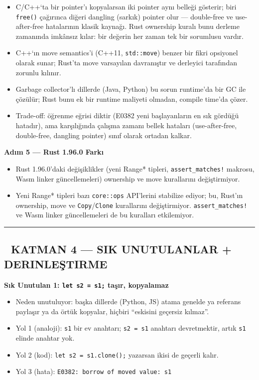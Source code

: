 \documentclass[12pt,a4paper]{article}
\begin{document}
\begin{itemize}
\tightlist
\item
  C/C++`ta bir pointer'ı kopyalarsan iki pointer aynı belleği gösterir; biri \texttt{free()} çağırınca diğeri dangling (sarkık) pointer olur --- double-free ve use-after-free hatalarının klasik kaynağı. Rust ownership kuralı bunu derleme zamanında imkânsız kılar: bir değerin her zaman tek bir sorumlusu vardır.
\item
  C++`ın move semantics'i (C++11, \texttt{std::move}) benzer bir fikri opsiyonel olarak sunar; Rust'ta move varsayılan davranıştır ve derleyici tarafından zorunlu kılınır.
\item
  Garbage collector'lı dillerde (Java, Python) bu sorun runtime'da bir GC ile çözülür; Rust bunu ek bir runtime maliyeti olmadan, compile time'da çözer.
\item
  Trade-off: öğrenme eğrisi diktir (E0382 yeni başlayanların en sık gördüğü hatadır), ama karşılığında çalışma zamanı bellek hataları (use-after-free, double-free, dangling pointer) sınıf olarak ortadan kalkar.
\end{itemize}

\textbf{Adım 5 --- Rust 1.96.0 Farkı}

\begin{itemize}
\tightlist
\item
  Rust 1.96.0'daki değişiklikler (yeni Range* tipleri, \texttt{assert\_matches!} makrosu, Wasm linker güncellemeleri) ownership ve move kurallarını değiştirmiyor.
\item
  Yeni Range* tipleri bazı \texttt{core::ops} API'lerini stabilize ediyor; bu, Rust'ın ownership, move ve \texttt{Copy}/\texttt{Clone} kurallarını değiştirmiyor. \texttt{assert\_matches!} ve Wasm linker güncellemeleri de bu kuralları etkilemiyor.
\end{itemize}

\begin{center}\rule{0.5\linewidth}{0.5pt}\end{center}

\subsection{🔴 KATMAN 4 --- SIK UNUTULANLAR + DERINLEŞTIRME}\label{katman-4-—-sik-unutulanlar-derinleştirme-10}

\textbf{Sık Unutulan 1: \texttt{let\ s2\ =\ s1;} taşır, kopyalamaz}

\begin{itemize}
\tightlist
\item
  Neden unutuluyor: başka dillerde (Python, JS) atama genelde ya referans paylaşır ya da örtük kopyalar, hiçbiri ``eskisini geçersiz kılmaz''.
\item
  Yol 1 (analoji): \texttt{s1} bir ev anahtarı; \texttt{s2\ =\ s1} anahtarı devretmektir, artık \texttt{s1} elinde anahtar yok.
\item
  Yol 2 (kod): \texttt{let\ s2\ =\ s1.clone();} yazarsan ikisi de geçerli kalır.
\item
  Yol 3 (hata): \texttt{E0382:\ borrow\ of\ moved\ value:\ s1}
\end{itemize}
\end{document}
